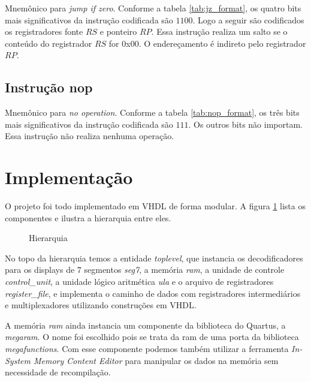 \documentclass[a4paper, 12pt]{article}
\begin{document}
Mnemônico para \textit{jump if zero}. Conforme a tabela \ref{tab:jz_format}, os 
quatro bits mais significativos da instrução codificada são $1100$. 
Logo a seguir são codificados os registradores fonte $RS$ e ponteiro $RP$.
Essa instrução realiza um salto se o conteúdo do registrador $RS$ for 0x00.
O endereçamento é indireto pelo registrador $RP$.

\subsection{Instrução nop}
\begin{table}[ht]
	\centering
	\caption{Formato da instrução codificada \textit{nop}}
	\label{tab:nop_format}
\end{table}


Mnemônico para \textit{no operation}. Conforme a tabela \ref{tab:nop_format}, os 
três bits mais significativos da instrução codificada são $111$. Os outros bits não importam.
Essa instrução não realiza nenhuma operação.

\section{Implementação}

O projeto foi todo implementado em VHDL de forma modular.
A figura \ref{fig:hierarquia} lista os componentes e ilustra a hierarquia entre eles.

\begin{figure}[ht]
	\centering
    \def\svgwidth{\columnwidth}
    
	\caption{Hierarquia}
	\label{fig:hierarquia}
\end{figure}

\par
No topo da hierarquia temos a entidade \textit{toplevel}, que instancia os decodificadores para
os displays de 7 segmentos \textit{seg7}, a memória \textit{ram}, a unidade de controle
\textit{control\_unit}, a unidade lógico aritmética \textit{ula} e o arquivo de registradores
\textit{register\_file}, e implementa o caminho de dados com registradores intermediários
e multiplexadores utilizando construções em VHDL.

\par
A memória \textit{ram} ainda instancia um componente da biblioteca
do Quartus, a \textit{megaram}. O nome foi escolhido pois se trata da
ram de uma porta da biblioteca \textit{megafunctions}. Com esse componente
podemos também utilizar a ferramenta \textit{In-System Memory Content Editor} para
manipular os dados na memória sem necessidade de recompilação.
\end{document}
